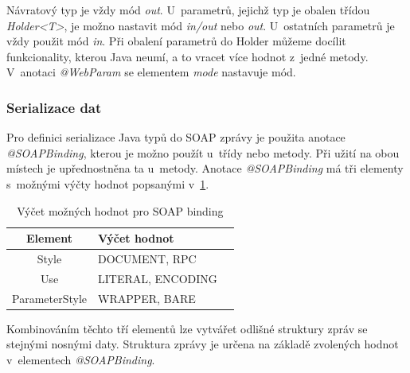 \documentclass[11pt,twoside,a4paper]{book}
\begin{document}
Návratový typ je vždy mód {\em out}. U~parametrů, jejichž typ je obalen
třídou {\em Holder<T>}, je možno nastavit mód {\em in/out} nebo {\em out}.
U~ostatních parametrů je vždy použit mód {\em in}. Při obalení parametrů do Holder
můžeme docílit funkcionality, kterou Java neumí, a to vracet více hodnot
z~jedné metody. V~anotaci {\em @WebParam} se elementem {\em mode} nastavuje mód.

\subsubsection{Serializace dat}
\label{subsec:serializace-dat}

Pro definici serializace Java typů do SOAP zprávy je použita anotace {\em @SOAPBinding}, kterou
je možno použít u~třídy nebo metody.
Při užití na obou místech je upřednostněna ta u~metody. Anotace {\em @SOAPBinding} má
tři elementy s~možnými výčty hodnot popsanými
v~\ref{tab:soap-binding-vycet-hodnot}.

\begin{table}[h]
\begin{center}
\begin{tabular}{|c|l|l|}
\hline
\textbf{Element} & \textbf{Výčet hodnot} \\
\hline
Style & DOCUMENT, RPC \\
\hline
Use & LITERAL, ENCODING \\
\hline
ParameterStyle & WRAPPER, BARE \\
\hline
\end{tabular}
\end{center}
\caption{Výčet možných hodnot pro SOAP binding}
\label{tab:soap-binding-vycet-hodnot}
\end{table}

Kombinováním těchto tří elementů lze vytvářet odlišné struktury zpráv se stejnými nosnými
daty. Struktura zprávy je určena na základě zvolených hodnot v~elementech {\em @SOAPBinding}.
\end{document}
